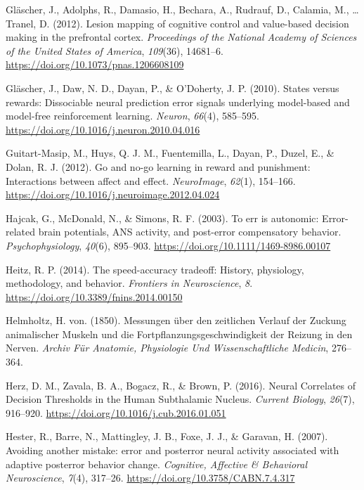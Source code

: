 \documentclass[12pt,openany]{book}
\theoremstyle{definition}
\theoremstyle{definition}
\theoremstyle{definition}
\theoremstyle{remark}
\begin{document}
\hypertarget{ref-Glascher2012}{}
Gläscher, J., Adolphs, R., Damasio, H., Bechara, A., Rudrauf, D.,
Calamia, M., \ldots{} Tranel, D. (2012). Lesion mapping of cognitive
control and value-based decision making in the prefrontal cortex.
\emph{Proceedings of the National Academy of Sciences of the United
States of America}, \emph{109}(36), 14681--6.
\url{https://doi.org/10.1073/pnas.1206608109}

\hypertarget{ref-Glascher2010}{}
Gläscher, J., Daw, N. D., Dayan, P., \& O'Doherty, J. P. (2010). States
versus rewards: Dissociable neural prediction error signals underlying
model-based and model-free reinforcement learning. \emph{Neuron},
\emph{66}(4), 585--595.
\url{https://doi.org/10.1016/j.neuron.2010.04.016}

\hypertarget{ref-Guitart-Masip2012a}{}
Guitart-Masip, M., Huys, Q. J. M., Fuentemilla, L., Dayan, P., Duzel,
E., \& Dolan, R. J. (2012). Go and no-go learning in reward and
punishment: Interactions between affect and effect. \emph{NeuroImage},
\emph{62}(1), 154--166.
\url{https://doi.org/10.1016/j.neuroimage.2012.04.024}

\hypertarget{ref-Hajcak2003}{}
Hajcak, G., McDonald, N., \& Simons, R. F. (2003). To err is autonomic:
Error-related brain potentials, ANS activity, and post-error
compensatory behavior. \emph{Psychophysiology}, \emph{40}(6), 895--903.
\url{https://doi.org/10.1111/1469-8986.00107}

\hypertarget{ref-Heitz2014}{}
Heitz, R. P. (2014). The speed-accuracy tradeoff: History, physiology,
methodology, and behavior. \emph{Frontiers in Neuroscience}, \emph{8}.
\url{https://doi.org/10.3389/fnins.2014.00150}

\hypertarget{ref-Helmholtz1850}{}
Helmholtz, H. von. (1850). Messungen über den zeitlichen Verlauf der
Zuckung animalischer Muskeln und die Fortpflanzungsgeschwindigkeit der
Reizung in den Nerven. \emph{Archiv Für Anatomie, Physiologie Und
Wissenschaftliche Medicin}, 276--364.

\hypertarget{ref-Herz2016a}{}
Herz, D. M., Zavala, B. A., Bogacz, R., \& Brown, P. (2016). Neural
Correlates of Decision Thresholds in the Human Subthalamic Nucleus.
\emph{Current Biology}, \emph{26}(7), 916--920.
\url{https://doi.org/10.1016/j.cub.2016.01.051}

\hypertarget{ref-Hester2007}{}
Hester, R., Barre, N., Mattingley, J. B., Foxe, J. J., \& Garavan, H.
(2007). Avoiding another mistake: error and posterror neural activity
associated with adaptive posterror behavior change. \emph{Cognitive,
Affective \& Behavioral Neuroscience}, \emph{7}(4), 317--26.
\url{https://doi.org/10.3758/CABN.7.4.317}
\end{document}
